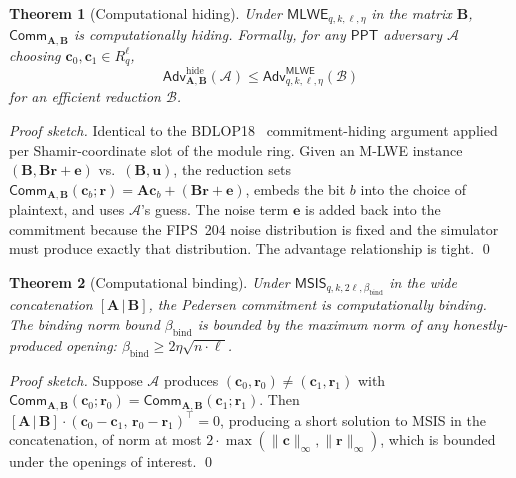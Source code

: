 \documentclass[11pt,a4paper]{article}
\newtheorem{theorem}{Theorem}
\theoremstyle{definition}
\theoremstyle{remark}
\newcommand{\Rq}{R_q}
\newcommand{\PPT}{\mathsf{PPT}}
\newcommand{\Adv}{\mathsf{Adv}}
\newcommand{\MLWE}{\mathsf{MLWE}}
\newcommand{\MSIS}{\mathsf{MSIS}}
\newcommand{\Comm}{\mathsf{Comm}}
\begin{document}
\begin{theorem}[Computational hiding]
\label{thm:pedersen-hiding}
Under $\MLWE_{q, k, \ell, \eta}$ in the matrix $\mathbf{B}$,
$\Comm_{\mathbf{A}, \mathbf{B}}$ is computationally hiding. Formally,
for any $\PPT$ adversary $\mathcal{A}$ choosing
$\mathbf{c}_0, \mathbf{c}_1 \in \Rq^\ell$,
\[
\Adv^{\mathrm{hide}}_{\mathbf{A}, \mathbf{B}}(\mathcal{A})
\le
\Adv^{\MLWE}_{q, k, \ell, \eta}(\mathcal{B})
\]
for an efficient reduction $\mathcal{B}$.
\end{theorem}

\begin{proof}[Proof sketch]
Identical to the BDLOP18~\cite{boschini2024ringtail} commitment-hiding
argument applied per Shamir-coordinate slot of the module ring.
Given an M-LWE instance $(\mathbf{B}, \mathbf{B}\mathbf{r} + \mathbf{e})$
vs.\ $(\mathbf{B}, \mathbf{u})$, the reduction sets
$\Comm_{\mathbf{A}, \mathbf{B}}(\mathbf{c}_b; \mathbf{r})
= \mathbf{A}\mathbf{c}_b + (\mathbf{B}\mathbf{r} + \mathbf{e})$, embeds
the bit $b$ into the choice of plaintext, and uses $\mathcal{A}$'s
guess. The noise term $\mathbf{e}$ is added back into the commitment
because the FIPS~204 noise distribution is fixed and the simulator
must produce exactly that distribution. The advantage
relationship is tight. \qed
\end{proof}

\begin{theorem}[Computational binding]
\label{thm:pedersen-binding}
Under $\MSIS_{q, k, 2\ell, \beta_{\mathrm{bind}}}$ in the wide
concatenation $[\mathbf{A} \,|\, \mathbf{B}]$, the Pedersen commitment
is computationally binding. The binding norm bound
$\beta_{\mathrm{bind}}$ is bounded by the maximum norm of any
honestly-produced opening:
$\beta_{\mathrm{bind}} \ge 2\eta\sqrt{n \cdot \ell}$.
\end{theorem}

\begin{proof}[Proof sketch]
Suppose $\mathcal{A}$ produces
$(\mathbf{c}_0, \mathbf{r}_0) \ne (\mathbf{c}_1, \mathbf{r}_1)$ with
$\Comm_{\mathbf{A},\mathbf{B}}(\mathbf{c}_0;\mathbf{r}_0)
= \Comm_{\mathbf{A},\mathbf{B}}(\mathbf{c}_1;\mathbf{r}_1)$. Then
$[\mathbf{A}\,|\,\mathbf{B}] \cdot
(\mathbf{c}_0 - \mathbf{c}_1,\,\mathbf{r}_0 - \mathbf{r}_1)^\top = 0$,
producing a short solution to MSIS in the concatenation, of norm
at most $2 \cdot \max(\|\mathbf{c}\|_\infty, \|\mathbf{r}\|_\infty)$,
which is bounded under the openings of interest. \qed
\end{proof}
\end{document}
